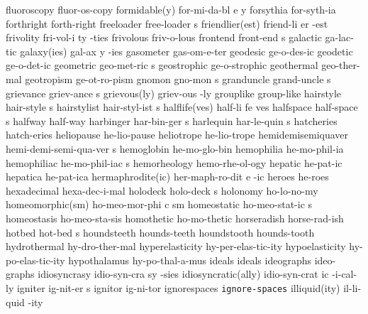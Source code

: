 \NewWordtrue
\1 fluoroscopy		fluor-os-copy	 	%
\3 formidable(y)	for-mi-da-bl e y
\1 forsythia		for-syth-ia
\1 forthright		forth-right
\5 freeloader		free-loader s
\3 friendlier(est)	friend-li er -est
\6 frivolity		fri-vol-i ty -ties
\1 frivolous		friv-o-lous
\5 frontend		front-end s		%
\1 galactic		ga-lac-tic
\3 galaxy(ies)		gal-ax y -ies
\1 gasometer		gas-om-e-ter
\1 geodesic		ge-o-des-ic
\NewWordtrue
\1 geodetic		ge-o-det-ic		%
\5 geometric		geo-met-ric s
\1 geostrophic          ge-o-strophic		%
\1 geothermal		geo-ther-mal		%
\1 geotropism		ge-ot-ro-pism
\5 gnomon		gno-mon s
\5 granduncle		grand-uncle s		%
\5 grievance		griev-ance s
\2 grievous(ly) 	griev-ous -ly
\NewWordtrue
\1 grouplike		group-like
\5 hairstyle		hair-style s
\5 hairstylist		hair-styl-ist s
\NewWordtrue
\3 halflife(ves)	half-li fe ves		%
\5 halfspace		half-space s            %
\1 halfway		half-way		%
\5 harbinger		har-bin-ger s
\5 harlequin		har-le-quin s
\1 hatcheries		hatch-eries
\NewWordtrue
\1 heliopause		he-lio-pause		%
\NewWordtrue
\1 heliotrope		he-lio-trope		%
\5 hemidemisemiquaver	hemi-demi-semi-qua-ver s	%
\1 hemoglobin		he-mo-glo-bin
\1 hemophilia		he-mo-phil-ia
\5 hemophiliac		he-mo-phil-iac s	%
\1 hemorheology 	hemo-rhe-ol-ogy
\1 hepatic		he-pat-ic
\1 hepatica		he-pat-ica		%
\3 hermaphrodite(ic)	her-maph-ro-dit e -ic
\1 heroes		he-roes
\1 hexadecimal		hexa-dec-i-mal
\NewWordtrue
\5 holodeck		holo-deck s		%
\1 holonomy		ho-lo-no-my
\3 homeomorphic(sm)	ho-meo-mor-phi c sm	%
\5 homeostatic		ho-meo-stat-ic s	%
\1 homeostasis		ho-meo-sta-sis		%
\1 homothetic		ho-mo-thetic
\1 horseradish		horse-rad-ish
\5 hotbed		hot-bed s		%
\NewWordtrue
\1 houndsteeth		hounds-teeth		%
\NewWordtrue
\1 houndstooth		hounds-tooth		%
\1 hydrothermal		hy-dro-ther-mal		%
\NewWordtrue
\1 hyperelasticity	hy-per-elas-tic-ity	%
\NewWordtrue
\1 hypoelasticity	hy-po-elas-tic-ity	%
\1 hypothalamus 	hy-po-thal-a-mus 
\1 ideals		ideals
\1 ideographs		ideo-graphs
\6 idiosyncrasy 	idio-syn-cra sy -sies
\3 idiosyncratic(ally)	idio-syn-crat ic -i-cal-ly
\5 igniter		ig-nit-er s
\1 ignitor		ig-ni-tor
\1 ignorespaces 	{\tt\bs ignore-spaces}
\NewWordtrue
\2 illiquid(ity)	il-li-quid -ity		%
